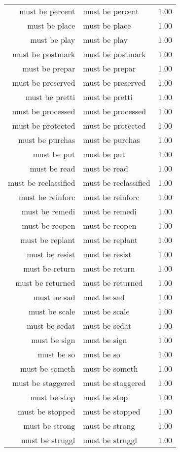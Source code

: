 \begin{table}[ht]
\begin{tabular}{rlr}
  must be percent & must be percent & 1.00 \\ 
  must be place & must be place & 1.00 \\ 
  must be play & must be play & 1.00 \\ 
  must be postmark & must be postmark & 1.00 \\ 
  must be prepar & must be prepar & 1.00 \\ 
  must be preserved & must be preserved & 1.00 \\ 
  must be pretti & must be pretti & 1.00 \\ 
  must be processed & must be processed & 1.00 \\ 
  must be protected & must be protected & 1.00 \\ 
  must be purchas & must be purchas & 1.00 \\ 
  must be put & must be put & 1.00 \\ 
  must be read & must be read & 1.00 \\ 
  must be reclassified & must be reclassified & 1.00 \\ 
  must be reinforc & must be reinforc & 1.00 \\ 
  must be remedi & must be remedi & 1.00 \\ 
  must be reopen & must be reopen & 1.00 \\ 
  must be replant & must be replant & 1.00 \\ 
  must be resist & must be resist & 1.00 \\ 
  must be return & must be return & 1.00 \\ 
  must be returned & must be returned & 1.00 \\ 
  must be sad & must be sad & 1.00 \\ 
  must be scale & must be scale & 1.00 \\ 
  must be sedat & must be sedat & 1.00 \\ 
  must be sign & must be sign & 1.00 \\ 
  must be so & must be so & 1.00 \\ 
  must be someth & must be someth & 1.00 \\ 
  must be staggered & must be staggered & 1.00 \\ 
  must be stop & must be stop & 1.00 \\ 
  must be stopped & must be stopped & 1.00 \\ 
  must be strong & must be strong & 1.00 \\ 
  must be struggl & must be struggl & 1.00 \\ 

\end{tabular}
\end{table}
